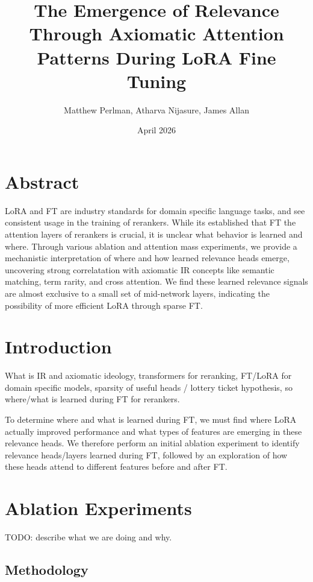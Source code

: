 \documentclass{article}
\title{The Emergence of Relevance Through Axiomatic Attention Patterns During LoRA Fine Tuning}
\author{Matthew Perlman, Atharva Nijasure, James Allan}
\date{April 2026}
\begin{document}
\maketitle

\section*{Abstract}

LoRA and FT are industry standards for domain specific language tasks, and see consistent usage in the training of rerankers.
While its established that FT the attention layers of rerankers is crucial, it is unclear what behavior is learned and where.
Through various ablation and attention mass experiments, we provide a mechanistic interpretation of where and how learned relevance heads emerge, uncovering strong correlatation with axiomatic IR concepts like semantic matching, term rarity, and cross attention.
We find these learned relevance signals are almost exclusive to a small set of mid-network layers, indicating the possibility of more efficient LoRA through sparse FT.

\section*{Introduction}

What is IR and axiomatic ideology, transformers for reranking, FT/LoRA for domain specific models, sparsity of useful heads / lottery ticket hypothesis, so where/what is learned during FT for rerankers.

\vspace{1em}

To determine where and what is learned during FT, we must find where LoRA actually improved performance and what types of features are emerging in these relevance heads.
We therefore perform an initial ablation experiment to identify relevance heads/layers learned during FT, followed by an exploration of how these heads attend to different features before and after FT.

\newpage

\section*{Ablation Experiments}

TODO: describe what we are doing and why.

\subsection*{Methodology}
\end{document}
